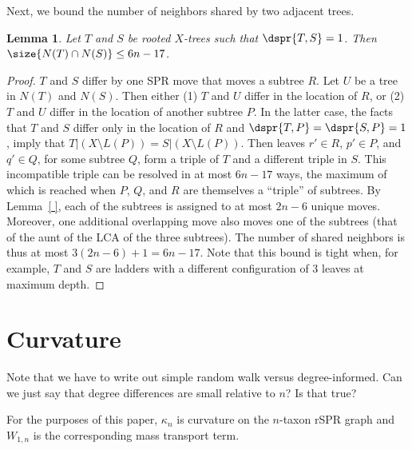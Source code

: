 \documentclass{amsart}
\newtheorem{lemma}[theorem]{Lemma}
\begin{document}
Next, we bound the number of neighbors shared by two adjacent trees.

\begin{lemma}
	\label{lem:shared_neighbors}
Let $T$ and $S$ be rooted $X$-trees such that $\dspr{T,S} = 1$.
Then $\size{N(T) \cap N(S)} \le 6n - 17$.
\end{lemma}

\begin{proof}
	$T$ and $S$ differ by one SPR move that moves a subtree $R$.
	Let $U$ be a tree in $N(T)$ and $N(S)$.
	Then either (1) $T$ and $U$ differ in the location of $R$, or (2) $T$ and $U$ differ in the location of another subtree $P$.
	In the latter case, the facts that $T$ and $S$ differ only in the location of $R$ and $\dspr{T,P} = \dspr{S,P} = 1$, imply that $T|(X \setminus L(P)) = S|(X \setminus L(P))$.
	Then leaves $r' \in R$, $p' \in P$, and $q' \in Q$, for some subtree $Q$, form a triple of $T$ and a different triple in $S$.
	This incompatible triple can be resolved in at most $6n - 17$ ways, the maximum of which is reached when $P$, $Q$, and $R$ are themselves a ``triple'' of subtrees.
	By Lemma~\ref{ }, each of the subtrees is assigned to at most $2n-6$ unique moves.
	Moreover, one additional overlapping move also moves one of the subtrees (that of the aunt of the LCA of the three subtrees).
	The number of shared neighbors is thus at most $3(2n-6) + 1 = 6n-17$.
	Note that this bound is tight when, for example, $T$ and $S$ are ladders with a different configuration of 3 leaves at maximum depth.
\end{proof}





\section{Curvature}
Note that we have to write out simple random walk versus degree-informed.
Can we just say that degree differences are small relative to $n$? Is that true?

For the purposes of this paper, $\kappa_n$ is curvature on the $n$-taxon rSPR graph and $W_{1,n}$ is the corresponding mass transport term.
\end{document}
